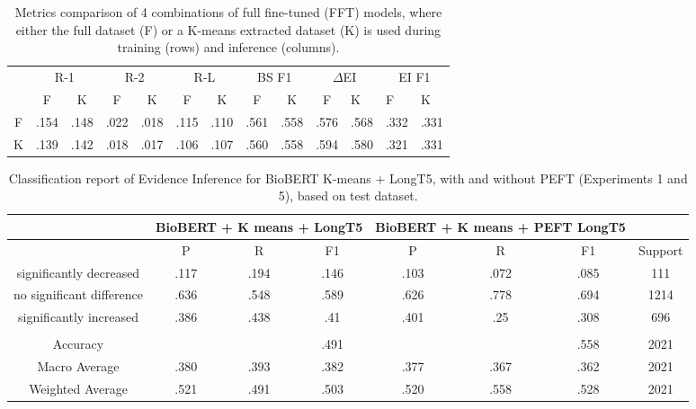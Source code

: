 \documentclass[11pt]{article}
\begin{document}
\begin{table}[h]
    \centering
    \small
    \begin{tabular}{cccccccccclll}
        \toprule
         & \multicolumn{2}{c}{R-1}&  \multicolumn{2}{c}{R-2}&  \multicolumn{2}{c}{R-L}& \multicolumn{2}{c}{BS F1}& \multicolumn{2}{c}{\(\Delta\)EI}& \multicolumn{2}{c}{EI F1}\\
         & F&K& F& K& F& K& F& K& F&K&F&K\\
         \midrule
         F&  .154&  .148&  .022&  .018&  .115&  .110&  .561&  .558&  .576& .568& .332&.331\\
         K&  .139&  .142&  .018&  .017&  .106&  .107&  .560&  .558&  .594& .580& .321&.331\\
         \bottomrule
    \end{tabular}
\caption{Metrics comparison of 4 combinations of full fine-tuned (FFT) models, where either the full dataset (F) or a K-means extracted dataset (K) is used during training (rows) and inference (columns).}
\label{tab:fft_comparison}
\end{table}

\FloatBarrier
\begin{table}[h!]
    \centering
    \small
    \begin{tabular}{cccccccc}
        \toprule
        & \multicolumn{3}{c}{BioBERT + K means + LongT5}& \multicolumn{3}{c}{BioBERT + K means + PEFT LongT5}& \\
        \midrule
        & P & R & F1 & P & R & F1 & Support\\
        significantly decreased & .117 & .194 & .146 & .103 & .072 & .085 & 111\\
        no significant difference & .636 & .548 & .589 & .626 & .778 & .694 & 1214\\
        significantly increased & .386 & .438 & .41 & .401 & .25 & .308 & 696\\
        &  &  &  &  &  &  & \\
        Accuracy &  &  & .491 &  &  & .558 & 2021\\
        Macro Average & .380 & .393 & .382 & .377 & .367 & .362 & 2021\\
        Weighted Average & .521 & .491 & .503 & .520 & .558 & .528 & 2021\\
        \bottomrule
    \end{tabular}
    \caption{Classification report of Evidence Inference for BioBERT K-means + LongT5, with and without PEFT (Experiments 1 and 5), based on test dataset.}
    \label{tab:peft_classification_report}
\end{table}
\end{document}

